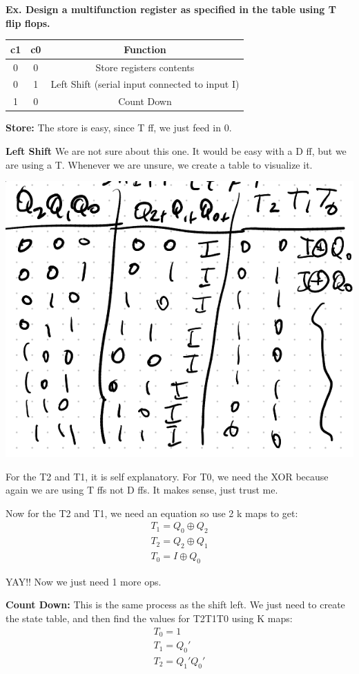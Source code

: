 \documentclass[12pt,letterpaper]{article} \usepackage{amsmath} \usepackage{graphicx} \usepackage[margin=1in]{geometry} \usepackage{longtable}  \usepackage{amssymb}
\begin{document}
		\begin{mdframed}[]
		\textbf{Ex. Design a multifunction register as specified in the table using T flip flops.}
		\begin{center}
		\begin{tabular}{|c|c|c|}
			\hline
			\textbf{c1} & \textbf{c0} & \textbf{Function} \\
			\hline
			0 & 0 & Store registers contents \\
			\hline
			0 & 1 & Left Shift (serial input connected to input I) \\
			\hline
			1 & 0 & Count Down \\
			\hline
		\end{tabular} 
		\end{center}
	
		\textbf{Store: } The store is easy, since T ff, we just feed in 0.
		
		\textbf{Left Shift} We are not sure about this one. It would be easy with a D ff, but we are using a T. Whenever we are unsure, we create a table to visualize it. 
		
		\begin{center}
		\includegraphics[width=0.5\linewidth]{ex1}
		\end{center}
	
		For the T2 and T1, it is self explanatory. For T0, we need the XOR because again we are using T ffs not D ffs. It makes sense, just trust me. 
		
		Now for the T2 and T1, we need an equation so use 2 k maps to get:
		\begin{align*}
			T_1 = Q_0 \oplus Q_2 \\
			T_2 = Q_2 \oplus Q_1 \\
			T_0 = I\oplus Q_0
		\end{align*}
	
		YAY!! Now we just need 1 more ops. 
		
		\textbf{Count Down: } This is the same process as the shift left. We just need to create the state table, and then find the values for T2T1T0 using K maps: 
		\begin{align*}
			T_0 = 1\\
			T_1 = Q_0 '\\
			T_2 = Q_1 ' Q_0 '
		\end{align*}
	

\end{mdframed}
\end{document}
